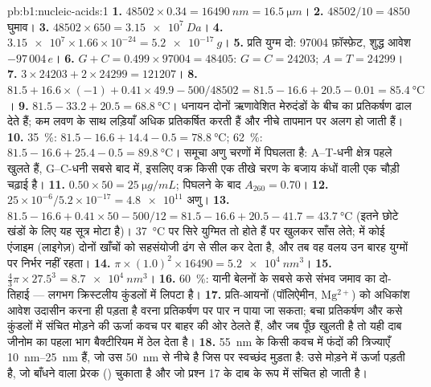 \begin{solution}{pb:b1:nucleic-acids:1}
\textbf{1.} $\num{48502}\times 0.34 = \qty{16490}{nm} = \qty{16.5}{\micro m}$।
\textbf{2.} $\num{48502}/10 = 4850$ घुमाव।
\textbf{3.} $\num{48502}\times 650 = \qty{3.15e7}{Da}$।
\textbf{4.} $\num{3.15e7}\times 1.66\times 10^{-24} = \qty{5.2e-17}{g}$।
\textbf{5.} प्रति युग्म दो: \num{97004} फ़ॉस्फ़ेट, शुद्ध आवेश $-97\,004\,e$।
\textbf{6.} $G + C = 0.499\times\num{97004} = \num{48405}$: $G = C =
\num{24203}$; $A = T = \num{24299}$।
\textbf{7.} $3\times\num{24203} + 2\times\num{24299} = \num{121207}$।
\textbf{8.} $81.5 + 16.6\times(-1) + 0.41\times 49.9 - 500/48502 =
81.5 - 16.6 + 20.5 - 0.01 = \qty{85.4}{\celsius}$।
\textbf{9.} $81.5 - 33.2 + 20.5 = \qty{68.8}{\celsius}$। धनायन दोनों
ऋणावेशित मेरुदंडों के बीच का प्रतिकर्षण ढाल देते हैं; कम
लवण के साथ लड़ियाँ अधिक प्रतिकर्षित करती हैं और नीचे तापमान पर अलग हो जाती हैं।
\textbf{10.} \qty{35}{\%}: $81.5 - 16.6 + 14.4 - 0.5 =
\qty{78.8}{\celsius}$; \qty{62}{\%}: $81.5 - 16.6 + 25.4 - 0.5 =
\qty{89.8}{\celsius}$। समूचा अणु चरणों में पिघलता है: A--T-धनी
क्षेत्र पहले खुलते हैं, G--C-धनी सबसे बाद में, इसलिए वक्र किसी एक तीखे
चरण के बजाय कंधों वाली एक चौड़ी चढ़ाई है।
\textbf{11.} $0.50\times 50 = \qty{25}{\micro g/mL}$; पिघलने के बाद
$A_{260} = 0.70$।
\textbf{12.} $25\times 10^{-6}/5.2\times 10^{-17} = \num{4.8e11}$ अणु।
\textbf{13.} $81.5 - 16.6 + 0.41\times 50 - 500/12 = 81.5 - 16.6 + 20.5
- 41.7 = \qty{43.7}{\celsius}$ (इतने छोटे खंडों के लिए यह सूत्र मोटा
है)। \qty{37}{\celsius} पर सिरे युग्मित तो होते हैं पर खुलकर साँस लेते;
 में कोई एंजाइम (लाइगेज़) दोनों खाँचों को सहसंयोजी ढंग से सील कर
देता है, और तब वह वलय उन बारह युग्मों पर निर्भर नहीं रहता।
\textbf{14.} $\pi\times(1.0)^2\times\num{16490} = \qty{5.2e4}{nm^3}$।
\textbf{15.} $\frac{4}{3}\pi\times 27.5^3 = \qty{8.7e4}{nm^3}$।
\textbf{16.} \qty{60}{\%}: यानी बेलनों के सबसे कसे संभव जमाव का
दो-तिहाई ---  लगभग क्रिस्टलीय कुंडलों में लिपटा है।
\textbf{17.} प्रति-आयनों (पॉलिऐमीन, $\mathrm{Mg^{2+}}$) को अधिकांश आवेश
उदासीन करना ही पड़ता है वरना प्रतिकर्षण पर पार न पाया जा सकता;
बचा प्रतिकर्षण और कसे कुंडलों में संचित मोड़ने की ऊर्जा
कवच पर बाहर की ओर ठेलते हैं, और जब पूँछ खुलती है तो यही दाब जीनोम का
पहला भाग बैक्टीरियम में ठेल देता है।
\textbf{18.} \qty{55}{nm} के किसी कवच में फंदों की त्रिज्याएँ
\qtyrange{10}{25}{nm} हैं, जो उस \qty{50}{nm} से नीचे है जिस पर 
स्वच्छंद मुड़ता है: उसे मोड़ने में ऊर्जा पड़ती है, जो बाँधने वाला प्रेरक
() चुकाता है और जो प्रश्न 17 के दाब के रूप में संचित हो जाती है।

\end{solution}
